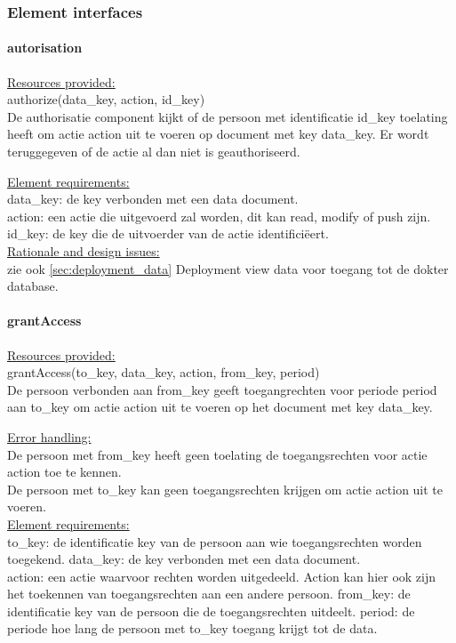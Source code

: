 \documentclass[a4paper,10pt]{article}
\begin{document}
\subsubsection{Element interfaces} 

\paragraph{autorisation}
\underline{Resources provided:}\\
authorize(data\_key, action, id\_key)\\
De authorisatie component kijkt of de persoon met identificatie id\_key toelating heeft om actie action uit te voeren op document met key data\_key.  Er wordt teruggegeven of de actie al dan niet is geauthoriseerd.

\underline{Element requirements:}\\
data\_key: de key verbonden met een data document.\\
action: een actie die uitgevoerd zal worden, dit kan read, modify of push zijn.\\
id\_key: de key die de uitvoerder van de actie identifici\"{e}ert.\\

\underline{Rationale and design issues:}\\
zie ook \ref{sec:deployment_data} Deployment view data voor toegang tot de dokter database.
%

\paragraph{grantAccess}
\underline{Resources provided:}\\
grantAccess(to\_key, data\_key, action, from\_key, period)\\
De persoon verbonden aan from\_key geeft toegangrechten voor periode period aan to\_key om actie action uit te voeren op het document met key data\_key.

\underline{Error handling:}\\
De persoon met from\_key heeft geen toelating de toegangsrechten voor actie action toe te kennen.\\
De persoon met to\_key kan geen toegangsrechten krijgen om actie action uit te voeren.\\

\underline{Element requirements:}\\
to\_key: de identificatie key van de persoon aan wie toegangsrechten worden toegekend.
data\_key: de key verbonden met een data document.\\
action: een actie waarvoor rechten worden uitgedeeld.  Action kan hier ook zijn het toekennen van toegangsrechten aan een andere persoon.
from\_key: de identificatie key van de persoon die de toegangsrechten uitdeelt.
period: de periode hoe lang de persoon met to\_key toegang krijgt tot de data.
\end{document}
